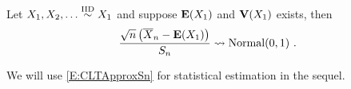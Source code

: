 \begin{prop}
Let $X_1,X_2,\ldots \overset{{\rm IID}}{\sim} X_1$ and suppose $\mathbf{E}(X_1)$ and $\mathbf{V}(X_1)$ exists, then
\begin{equation}\label{E:CLTApproxSn}
\frac{\sqrt{n} \left( \overline{X}_n - \mathbf{E}(X_1) \right)}{S_n} \rightsquigarrow \mbox{{\rm Normal}}(0,1) \ .
\end{equation}
\end{prop}

We will use \eqref{E:CLTApproxSn} for statistical estimation in the sequel.




